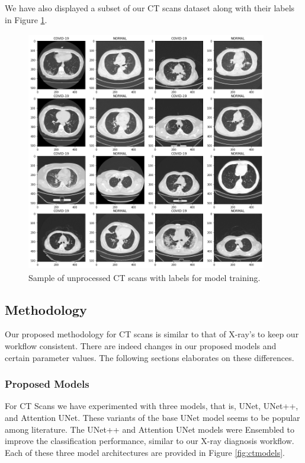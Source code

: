 We have also displayed a subset of our CT scans dataset along with their labels in Figure \ref{fig:ct data}.


\begin{figure}[H]
	\centering
	\includegraphics[width=10.5cm, height=10.5cm]{Images/CTScansDist.png}
	\caption{\small Sample of unprocessed CT scans with labels for model training.}
	\label{fig:ct data}
\end{figure}

\subsection{Methodology}

Our proposed methodology for CT scans is similar to that of X-ray's to keep our workflow consistent. There are indeed changes in our proposed models and certain parameter values. The following sections elaborates on these differences. 
\subsubsection{Proposed Models}

For CT Scans we have experimented with three models, that is, UNet, UNet++, and Attention UNet. These variants of the base UNet model seems to be popular among literature. The UNet++ and Attention UNet models were Ensembled to improve the classification performance, similar to our X-ray diagnosis workflow. Each of these three model architectures are provided in Figure \ref{fig:ctmodels}.

